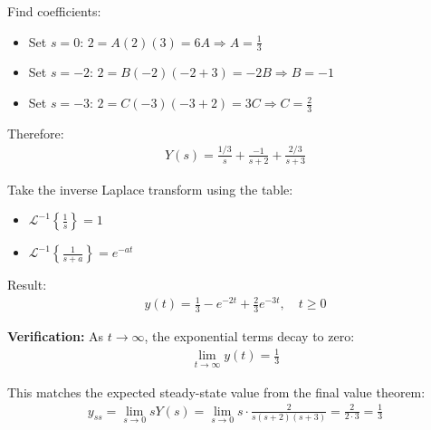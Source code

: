 \documentclass[11pt,a4paper]{article}
\begin{document}
Find coefficients:
\begin{itemize}
  \item Set $s = 0$: $2 = A(2)(3) = 6A \Rightarrow A = \frac{1}{3}$
  \item Set $s = -2$: $2 = B(-2)(-2+3) = -2B \Rightarrow B = -1$
  \item Set $s = -3$: $2 = C(-3)(-3+2) = 3C \Rightarrow C = \frac{2}{3}$
\end{itemize}

Therefore:
\begin{align}
  Y(s) = \frac{1/3}{s} + \frac{-1}{s+2} + \frac{2/3}{s+3}
\end{align}

Take the inverse Laplace transform using the table:
\begin{itemize}
  \item $\mathcal{L}^{-1}\left\{\frac{1}{s}\right\} = 1$
  \item $\mathcal{L}^{-1}\left\{\frac{1}{s+a}\right\} = e^{-at}$
\end{itemize}

Result:
\begin{align}
  y(t) = \frac{1}{3} - e^{-2t} + \frac{2}{3}e^{-3t}, \quad t \geq 0
\end{align}

\textbf{Verification:} As $t \to \infty$, the exponential terms decay to zero:
\begin{align}
  \lim_{t \to \infty} y(t) = \frac{1}{3}
\end{align}

This matches the expected steady-state value from the final value theorem:
\begin{align}
  y_{ss} = \lim_{s \to 0} sY(s) = \lim_{s \to 0} s \cdot \frac{2}{s(s+2)(s+3)} = \frac{2}{2 \cdot 3} = \frac{1}{3}
\end{align}
\end{document}
